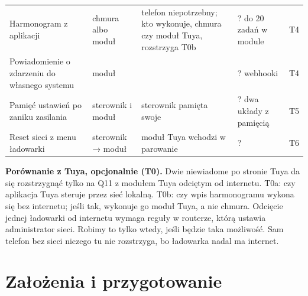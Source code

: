 \documentclass[11pt,a4paper]{article}
\begin{document}
\begin{longtable}{>{\raggedright\arraybackslash}p{3.95cm}>{\raggedright\arraybackslash}p{1.82cm}>{\raggedright\arraybackslash}p{4.15cm}>{\raggedright\arraybackslash}p{3.53cm}>{\raggedright\arraybackslash}p{0.95cm}}
Harmonogram z aplikacji & chmura albo moduł & \leavevmode{\symbolfont\color{apamber}\textbf{◐}} telefon niepotrzebny; kto wykonuje, chmura czy moduł Tuya, rozstrzyga T0b & ? do 20 zadań w module & T4 \\
Powiadomienie o zdarzeniu do własnego systemu & moduł & \leavevmode{\symbolfont\color{apred}\textbf{✘}} & ? webhooki & T4 \\
Pamięć ustawień po zaniku zasilania & sterownik i moduł & sterownik pamięta swoje & ? dwa układy z pamięcią & T5 \\
Reset sieci z menu ładowarki & sterownik {\symbolfont→} moduł & \leavevmode{\symbolfont\color{apgreen}\textbf{✔}} moduł Tuya wchodzi w parowanie & ? & T6 \\
\end{longtable}

\textbf{Porównanie z Tuya, opcjonalnie (T0).} Dwie niewiadome po stronie Tuya da się rozstrzygnąć tylko na Q11 z modułem Tuya odciętym od internetu. T0a: czy aplikacja Tuya steruje przez sieć lokalną. T0b: czy wpis harmonogramu wykona się bez internetu; jeśli tak, wykonuje go moduł Tuya, a nie chmura. Odcięcie jednej ładowarki od internetu wymaga reguły w routerze, którą ustawia administrator sieci. Robimy to tylko wtedy, jeśli będzie taka możliwość. Sam telefon bez sieci niczego tu nie rozstrzyga, bo ładowarka nadal ma internet.


\section{Założenia i przygotowanie}
\end{document}
